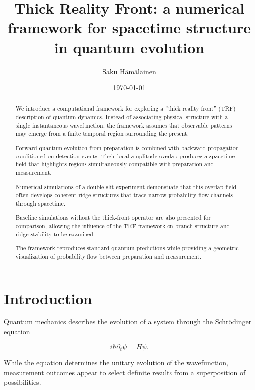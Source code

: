 \documentclass[aps,prl,reprint]{revtex4-2}
\begin{document}
\title{Thick Reality Front: a numerical framework for spacetime structure in quantum evolution}

\author{Saku H\"am\"al\"ainen}

\date{\today}

\begin{abstract}

We introduce a computational framework for exploring a
``thick reality front'' (TRF) description of quantum dynamics.
Instead of associating physical structure with a single
instantaneous wavefunction, the framework assumes that observable
patterns may emerge from a finite temporal region surrounding
the present.

Forward quantum evolution from preparation is combined with
backward propagation conditioned on detection events.
Their local amplitude overlap produces a spacetime field that
highlights regions simultaneously compatible with preparation
and measurement.

Numerical simulations of a double-slit experiment demonstrate
that this overlap field often develops coherent ridge structures
that trace narrow probability flow channels through spacetime.

Baseline simulations without the thick-front operator are also
presented for comparison, allowing the influence of the TRF
framework on branch structure and ridge stability to be examined.

The framework reproduces standard quantum predictions while
providing a geometric visualization of probability flow between
preparation and measurement.

\end{abstract}

\maketitle


\section{Introduction}

Quantum mechanics describes the evolution of a system through the
Schr\"odinger equation

\begin{equation}
i\hbar \partial_t \psi = H\psi .
\end{equation}

While the equation determines the unitary evolution of the
wavefunction, measurement outcomes appear to select definite
results from a superposition of possibilities.
\end{document}
